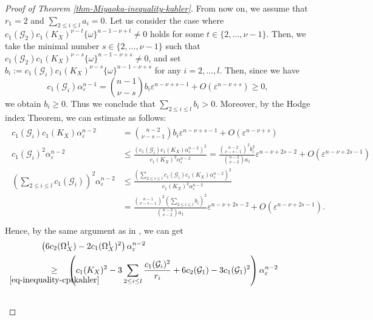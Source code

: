 \documentclass[12pt]{amsart}
\theoremstyle{definition}
\theoremstyle{remark}
\numberwithin{equation}{section}
\newcommand{\underalign}[2]{\quad \underset{\mathclap{\strut #1}}{#2}\quad}
\begin{document}
\begin{proof}[Proof of Theorem \ref{thm-Miyaoka-inequality-kahler}]
From now on, we assume that $r_1 =2$ and $\sum_{2\le i\le l} a_i  = 0$.
Let us consider the case where
$c_1(\mathcal{G}_2)c_1(K_X)^{\nu -t}\{\omega\}^{n-1-\nu+t}\neq 0 $ holds
for some $t \in \{ 2, \ldots, \nu-1\}$.
Then, we take the minimal number $s \in \{ 2, \ldots, \nu-1\}$ such that $c_1(\mathcal{G}_2)c_1(K_X)^{\nu -s}\{\omega\}^{n-1-\nu+s}\neq 0 $, and
set $b_i := c_1(\mathcal{G}_i)c_1(K_X)^{\nu -s}\{\omega\}^{n-1-\nu+s}$
for any $i = 2, \ldots, l$.
Then, since we have
$$
c_1(\mathcal{G}_i) \alpha_{ \varepsilon }^{n-1} 
= 
\binom{n-1}{\nu-s} b_i \varepsilon ^{n-\nu+s-1} + O(\varepsilon ^{n-\nu+s})
\ge 0,
$$
we obtain $b_i \ge 0$. 
Thus we conclude that   $\sum_{2 \le i\le l}b_{i}>0$.
Moreover, by the Hodge index Theorem, we can estimate as follows:
\begin{align}
\begin{split}
\label{eq-estimate-nu}
c_1(\mathcal{G}_i)c_1(K_X) \alpha_{ \varepsilon } ^{n-2}
&=
\binom{n-2}{\nu-s-1} b_i \varepsilon ^{n-\nu+s-1}  + O( \varepsilon ^{n-\nu+s}) 
\\
c_1(\mathcal{G}_i)^2 \alpha_{ \varepsilon } ^{n-2}
&\le \frac{\left(c_1(\mathcal{G}_i)c_1(K_X) \alpha_{ \varepsilon }^{n-2}\right)^2}{c_1(K_X)^2 \alpha_{ \varepsilon }^{n-2}}
=
\frac{\binom{n-2}{\nu-s-1}^2 b_{i}^{2} }{ \binom{n-2}{\nu-2}a_1}  \varepsilon ^{n-\nu + 2s -2} + O( \varepsilon ^{n-\nu + 2s -1})\\
\left ( \sum_{2 \le i \le l} c_1(\mathcal{G}_i) \right)^{2} \alpha_{ \varepsilon }^{n-2}
& \le \frac{ \left(\sum_{2 \le i \le l} c_1(\mathcal{G}_i)c_1(K_X)\alpha_{ \varepsilon }^{n-2} \right)^2}{c_1(K_X)^2\alpha_{ \varepsilon }^{n-2}}\\
&= \frac{\binom{n-1}{\nu-s-1}^2 (\sum_{2 \le i\le l}b_{i})^{2} }{ \binom{n-2}{\nu-2}a_1}  \varepsilon ^{n-\nu + 2s -2} + O( \varepsilon ^{n-\nu + 2s -1}).\\
 \end{split}
\end{align}
Hence, by the same argument as in \cite[p.26]{IM22}, we can get
\begin{align}
\begin{split}
\label{eq-inequality-cptkahler-2}
&\left(6c_2(\Omega_{X}^{1}) - 2 c_1(\Omega_{X}^{1})^2 \right)\alpha_{ \varepsilon }^{n-2} \\
& \underalign{\eqref{eq-inequality-cptkahler}}{\ge} 
\left(
c_1(K_X)^2
- 3\sum_{2\le i\le l}\frac{c_1(\mathcal{G}_i)^2}{r_i}  
+ 6c_2(\mathcal{G}_1) - 3 c_{1}(\mathcal{G}_1)^{2}
 \right)
\alpha_{ \varepsilon }^{n-2} 
\\\

\end{split}
\end{align}
\end{proof}
\end{document}
